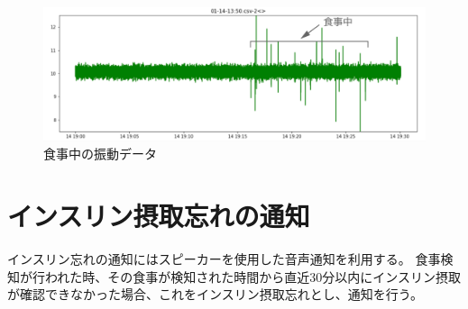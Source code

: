 \begin{figure}[htbp]
  \caption{食事中の振動データ}
  \label{fig:activities_vibration}
  \begin{center}
    \includegraphics[bb=0 0 1200 300,width=20cm]{assets/meal_vibration.png}
  \end{center}
\end{figure}

\section{インスリン摂取忘れの通知}

インスリン忘れの通知にはスピーカーを使用した音声通知を利用する。
食事検知が行われた時、その食事が検知された時間から直近30分以内にインスリン摂取が確認できなかった場合、これをインスリン摂取忘れとし、通知を行う。


